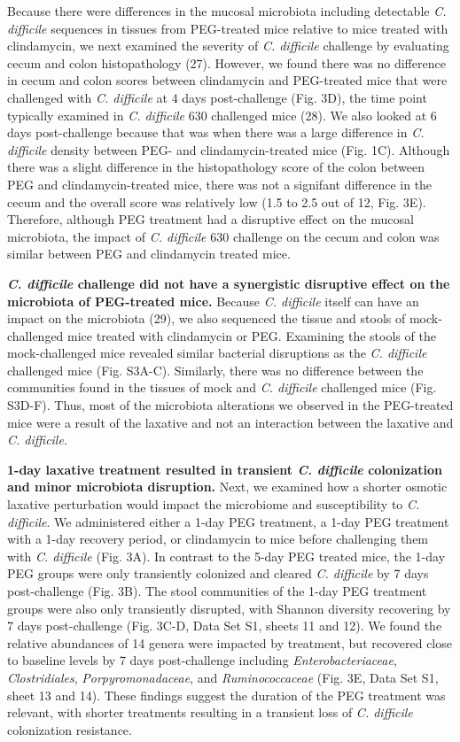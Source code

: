 \documentclass[
  11pt,
]{article}
\begin{document}
Because there were differences in the mucosal microbiota including
detectable \emph{C. difficile} sequences in tissues from PEG-treated
mice relative to mice treated with clindamycin, we next examined the
severity of \emph{C. difficile} challenge by evaluating cecum and colon
histopathology (27). However, we found there was no difference in cecum
and colon scores between clindamycin and PEG-treated mice that were
challenged with \emph{C. difficile} at 4 days post-challenge (Fig. 3D),
the time point typically examined in \emph{C. difficile} 630 challenged
mice (28). We also looked at 6 days post-challenge because that was when
there was a large difference in \emph{C. difficile} density between PEG-
and clindamycin-treated mice (Fig. 1C). Although there was a slight
difference in the histopathology score of the colon between PEG and
clindamycin-treated mice, there was not a signifant difference in the
cecum and the overall score was relatively low (1.5 to 2.5 out of 12,
Fig. 3E). Therefore, although PEG treatment had a disruptive effect on
the mucosal microbiota, the impact of \emph{C. difficile} 630 challenge
on the cecum and colon was similar between PEG and clindamycin treated
mice.

\textbf{\emph{C. difficile} challenge did not have a synergistic
disruptive effect on the microbiota of PEG-treated mice.} Because
\emph{C. difficile} itself can have an impact on the microbiota (29), we
also sequenced the tissue and stools of mock-challenged mice treated
with clindamycin or PEG. Examining the stools of the mock-challenged
mice revealed similar bacterial disruptions as the \emph{C. difficile}
challenged mice (Fig. S3A-C). Similarly, there was no difference between
the communities found in the tissues of mock and \emph{C. difficile}
challenged mice (Fig. S3D-F). Thus, most of the microbiota alterations
we observed in the PEG-treated mice were a result of the laxative and
not an interaction between the laxative and \emph{C. difficile}.

\textbf{1-day laxative treatment resulted in transient \emph{C.
difficile} colonization and minor microbiota disruption.} Next, we
examined how a shorter osmotic laxative perturbation would impact the
microbiome and susceptibility to \emph{C. difficile}. We administered
either a 1-day PEG treatment, a 1-day PEG treatment with a 1-day
recovery period, or clindamycin to mice before challenging them with
\emph{C. difficile} (Fig. 3A). In contrast to the 5-day PEG treated
mice, the 1-day PEG groups were only transiently colonized and cleared
\emph{C. difficile} by 7 days post-challenge (Fig. 3B). The stool
communities of the 1-day PEG treatment groups were also only transiently
disrupted, with Shannon diversity recovering by 7 days post-challenge
(Fig. 3C-D, Data Set S1, sheets 11 and 12). We found the relative
abundances of 14 genera were impacted by treatment, but recovered close
to baseline levels by 7 days post-challenge including
\emph{Enterobacteriaceae}, \emph{Clostridiales},
\emph{Porpyromonadaceae}, and \emph{Ruminococcaceae} (Fig. 3E, Data Set
S1, sheet 13 and 14). These findings suggest the duration of the PEG
treatment was relevant, with shorter treatments resulting in a transient
loss of \emph{C. difficile} colonization resistance.
\end{document}
